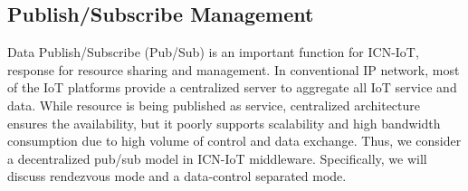 
\subsection{Publish/Subscribe Management}
Data Publish/Subscribe (Pub/Sub) is an important function for ICN-IoT, response for resource sharing and management. In conventional IP network, most of the IoT platforms provide a centralized server to aggregate all IoT service and data. While resource is being published as service,  centralized architecture ensures the availability, but it poorly supports scalability and high bandwidth consumption due to high volume of control and data exchange. Thus, we consider a decentralized pub/sub model in ICN-IoT middleware. Specifically, we will discuss rendezvous mode and a data-control separated mode.


